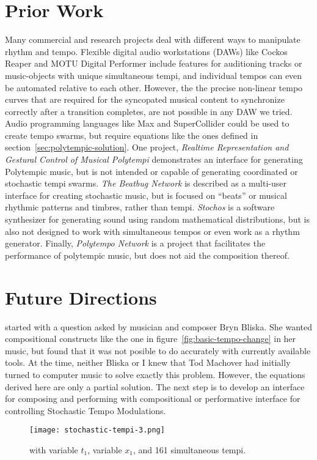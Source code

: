 \section{Prior Work}
\label{sec:polytempic-prior-work}
Many commercial and research projects deal with different ways to
manipulate rhythm and tempo. Flexible digital audio workstations (DAWs)
like Cockos Reaper and MOTU
Digital
Performer
include features for auditioning tracks or music-objects with unique
simultaneous tempi, and individual tempos can even be automated
relative to each other. However, the the precise non-linear tempo
curves that are required for the syncopated musical content to
synchronize correctly after a transition completes, are not possible in
any DAW we tried. Audio programming languages like
Max and
SuperCollider could be used
to create tempo swarms, but require equations like the ones defined in
section~\ref{sec:polytempic-solution}. One project, \textit{Realtime
  Representation and Gestural Control of Musical
  Polytempi}\cite{Nash2008} demonstrates an interface for generating
Polytempic music, but is not intended or capable of generating
coordinated or stochastic tempi swarms.  \textit{The Beatbug
  Network}\cite{Weinberg2002} is described as a multi-user interface
for creating stochastic music, but is focused on ``beats'' or musical
rhythmic patterns and timbres, rather than
tempi. \textit{Stochos}\cite{Bokesoy2003} is a software synthesizer
for generating sound using random mathematical distributions, but is
also not designed to work with simultaneous tempos or even work as a
rhythm generator. Finally, \textit{Polytempo Network}\cite{Kocher2014}
is a project that facilitates the performance of polytempic music, but
does not aid the composition thereof.

\section{Future Directions}
\label{sec:polytempic-future-directions}
\polytempic started with a question asked by musician and composer
Bryn Bliska. She wanted compositional constructs like the one in
figure~\ref{fig:basic-tempo-change} in her music, but found that it
was not posible to do accurately with currently available tools. At
the time, neither Bliska or I knew that Tod Machover had initially
turned to computer music to solve exactly this problem.  However, the
equations derived here are only a partial solution. The next step is
to develop an interface for composing and performing with
compositional or performative interface for controlling Stochastic
Tempo Modulations.

\begin{figure*}[]
  \texttt{[image: stochastic-tempi-3.png]}
  \caption{\polytempic with variable $t_1$, variable $x_1$, and 161
    simultaneous tempi.}
  \label{fig:polytempic-transition-3}
\end{figure*}


